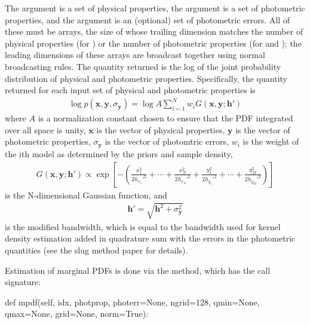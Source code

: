 \documentclass[letterpaper,10pt,english]{sphinxmanual}
\begin{document}
The argument  is a set of physical properties, the argument  is a set of photometric properties, and the argument  is an (optional) set of photometric errors. All of these must be arrays, the size of whose trailing dimension matches the number of physical properties (for ) or the number of photometric properties (for  and ); the leading dimensions of these arrays are broadcast together using normal broadcasting rules. The quantity returned is the log of the joint probability distribution of physical and photometric properties. Specifically, the quantity returned for each input set of physical and photometric properties is
\begin{equation*}
\begin{split}\log p(\mathbf{x}, \mathbf{y}, \sigma_{\mathbf{y}}) = \log A \sum_{i=1}^N w_i G(\mathbf{x}, \mathbf{y}; \mathbf{h}')\end{split}
\end{equation*}
where \(A\) is a normalization constant chosen to ensure that the PDF integrated over all space is unity, \(\mathbf{x}\) is the vector of physical properties, \(\mathbf{y}\) is the vector of photometric properties, \(\sigma_\mathbf{y}\) is the vector of photomtric errors, \(w_i\) is the weight of the ith model as determined by the priors and sample density,
\begin{equation*}
\begin{split}G\left(\mathbf{x}, \mathbf{y}; \mathbf{h}'\right) \propto \exp\left[-\left(\frac{x_1^2}{2h_{x_1}'^2} + \cdots + \frac{x_N^2}{2h_{x_N}'^2} + \frac{y_1^2}{2h_{y_1}'^2} + \cdots + \frac{y_M^2}{2h_{y_M}'^2} \right)\right]\end{split}
\end{equation*}
is the N-dimensional Gaussian function, and
\begin{equation*}
\begin{split}\mathbf{h'} = \sqrt{\mathbf{h}^2 + \sigma_{\mathbf{y}}^2}\end{split}
\end{equation*}
is the modified bandwidth, which is equal to the bandwidth used for kernel density estimation added in quadrature sum with the errors in the photometric quantities (see the slug method paper for details).

Estimation of marginal PDFs is done via the  method, which has the call signature:

\begin{sphinxVerbatim}[commandchars=\\\{\}]
def mpdf(self, idx, photprop, photerr=None, ngrid=128,
         qmin=None, qmax=None, grid=None, norm=True):
\end{sphinxVerbatim}
\end{document}
